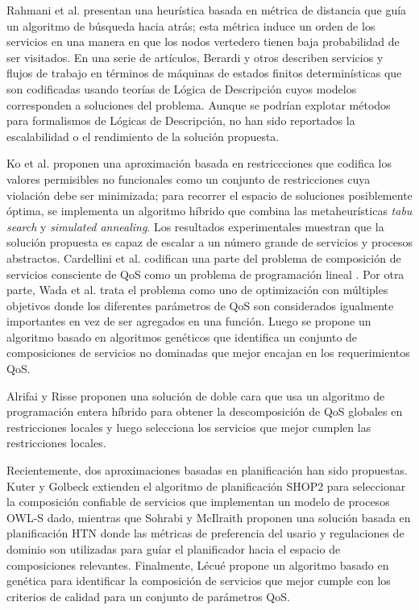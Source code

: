 Rahmani et al. \cite{rahmani08} presentan una heurística basada en métrica de distancia
que guía un algoritmo de búsqueda hacia atrás; esta métrica induce un orden de
los servicios en una manera en que los nodos vertedero tienen baja probabilidad
de ser visitados. En una serie de artículos, Berardi y otros \cite{berardi05,berardi08,berardi06}
describen
servicios y flujos de trabajo en términos de máquinas de estados finitos
determinísticas que son codificadas usando teorías de Lógica de Descripción
cuyos modelos corresponden a soluciones del problema. Aunque se podrían explotar
métodos para formalismos de Lógicas de Descripción, no han sido reportados la
escalabilidad o el rendimiento de la solución propuesta.

Ko et al. \cite{myoung08} proponen una aproximación basada en restriccciones que codifica
los valores permisibles no funcionales como un conjunto de restricciones cuya
violación debe ser minimizada; para recorrer el espacio de soluciones
posiblemente óptima, se implementa un algoritmo híbrido que combina las
metaheurísticas \emph{tabu search} y \emph{simulated annealing}. Los resultados
experimentales muestran que la solución propuesta es capaz de escalar a un
número grande de servicios y procesos abstractos. Cardellini et al. \cite{cardellini07}
codifican una parte del problema de composición de servicios consciente de QoS
como un problema de programación lineal \cite{cardellini07}. Por otra parte, Wada et al.
\cite{Hiroshi2008} trata el problema como uno de optimización con múltiples objetivos donde
los diferentes parámetros de QoS son considerados igualmente importantes en vez
de ser agregados en una función. Luego se propone un algoritmo basado en
algoritmos genéticos que identifica un conjunto de composiciones de servicios
no dominadas que mejor encajan en los requerimientos QoS.

Alrifai y Risse \cite{alrifaiR09} proponen una solución de doble cara que usa un
algoritmo de programación entera híbrido para obtener la descomposición de QoS
globales en restricciones locales y luego selecciona los servicios que mejor
cumplen las restricciones locales.

Recientemente, dos aproximaciones basadas en planificación han sido propuestas.
Kuter y Golbeck \cite{kuterG09} extienden el algoritmo de planificación SHOP2 para
seleccionar la composición confiable de servicios que implementan un modelo de
procesos OWL-S dado, mientras que Sohrabi y McIlraith \cite{sohrabiM09} proponen una
solución basada en planificación HTN donde las métricas de preferencia del
usario y regulaciones de dominio son utilizadas para guíar el planificador hacia
el espacio de composiciones relevantes. Finalmente, Lécué \cite{lecue09} propone un
algoritmo basado en genética para identificar la composición de servicios que
mejor cumple con los criterios de calidad para un conjunto de parámetros QoS.

